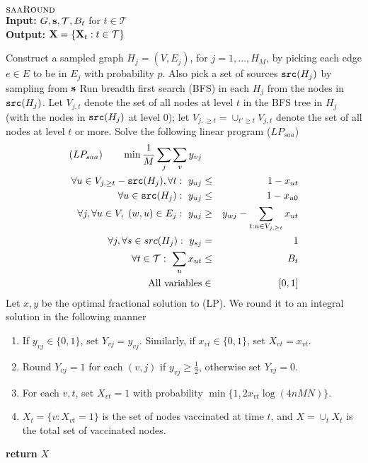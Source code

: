 \begin{algorithm}{}
\small
\caption{\small $\textsc{saaRound}{}$\\
\textbf{Input:} $G, \mathbf{s}, \mathcal{T}, B_t$ for $t\in\mathcal{T}$\\
\textbf{Output:} $\mathbf{X}=\{\mathbf{X}_t: t\in\mathcal{T}\}$
}
\label{alg:saaround}
\begin{algorithmic}[1]
\STATE
Construct a sampled graph $H_j=(V, E_j)$, for $j=1,\ldots,H_M$, by picking each edge $e\in E$ to be in $E_j$
with probability $p$. Also pick a set of sources $\texttt{src}(H_j)$ by sampling from $\mathbf{s}$
\STATE
Run breadth first search (BFS) in each $H_j$ from the nodes in $\texttt{src}(H_j)$.
Let $V_{j,t}$ denote the set of all nodes at level $t$ in the BFS tree in $H_j$ 
(with the nodes in $\texttt{src}(H_j)$ at level $0$); let $V_{j,\geq t}=\cup_{t'\geq t} V_{j,t}$ denote
the set of all nodes at level $t$ or more.
\STATE
Solve the following linear program ($LP_{saa}$)
\begin{eqnarray}
\label{eqn:obj}
(LP_{saa}) \qquad  \min \frac{1}{M}\sum_j \sum_v y_{vj} && \\
\label{eqn:xy}
\forall u \in V_{j, \geq t} - \texttt{src}(H_j), \forall t:\ y_{uj} &\leq& 1 - x_{ut} \\
\label{eqn:xy2}
\forall u \in \texttt{src}(H_j):\ y_{uj} &\leq& 1 - x_{u0} \\
\label{eqn1}
\forall j, \forall u\in V, \; (w, u)\in E_j:\ y_{uj} &\geq& y_{wj} - \sum_{t: u \in V_{j, \geq t}} x_{ut}\\
\label{eqn:src}
\forall j, \forall s \in src(H_j):\ y_{sj} &=& 1\\
\label{eqn:budget}
\forall t\in\mathcal{T}:\ \sum_u x_{ut} &\leq& B_t\\
\label{eqn01}
\mbox{All variables} &\in& [0, 1]
\end{eqnarray}
\STATE
Let $x, y$ be the optimal fractional solution to (LP).
We round it to an integral solution in the following manner
\begin{enumerate}
\item
If $y_{vj}\in\{0, 1\}$, set $Y_{vj}=y_{vj}$. Similarly, if $x_{vt}\in\{0, 1\}$, set $X_{vt}=x_{vt}$.
\item
Round $Y_{vj} = 1$ for each $(v,j)$ if $y_{vj} \geq \frac{1}{2}$, otherwise set $Y_{vj} = 0$.
\item
For each $v, t$, set $X_{vt}=1$ with probability $\min\{1, 2 x_{vt}\log(4nMN)\}$. 
\item
$X_t=\{v: X_{vt}=1\}$ is the set of nodes vaccinated at time $t$, and $X=\cup_t X_t$
is the total set of vaccinated nodes.
\end{enumerate}
\STATE \textbf{return} $X$
\end{algorithmic}
\end{algorithm}

